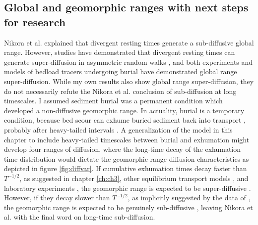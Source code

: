 \subsection{Global and geomorphic ranges with next steps for research}

Nikora et al. explained that divergent resting times generate a sub-diffusive global range.
However, studies have demonstrated that divergent resting times can generate super-diffusion in asymmetric random walks \citep{Weeks1996,Weeks1998}, and both experiments \citep{Bradley2017,Bradley2010} and models \citep{Pelosi2016,Wu2019,Wu2019a} of bedload tracers undergoing burial have demonstrated global range super-diffusion.
While my own results also show global range super-diffusion, they do not necessarily refute the Nikora et al. conclusion of sub-diffusion at long timescales.
I assumed sediment burial was a permanent condition which developed a non-diffusive geomorphic range.
In actuality, burial is a temporary condition, because bed scour can exhume buried sediment back into transport \citep{Wu2019a}, probably after heavy-tailed intervals \citep{Voepel2013,Martin2014}.
A generalization of the model in this chapter to include heavy-tailed timescales between burial and exhumation might develop four ranges of diffusion, where the long-time decay of the exhumation time distribution would dictate the geomorphic range diffusion characteristics as depicted in figure \ref{fig:diffvar}.
If cumulative exhumation times decay faster than $T^{-1/2}$, as suggested in chapter \ref{ch:ch3}, other equilibrium transport models \citep{Voepel2013, Martin2014}, and laboratory experiments \citep{Martin2014,Martin2012}, the geomorphic range is expected to be super-diffusive \citep{Weeks1998}.
However, if they decay slower than $T^{-1/2}$, as implicitly suggested by the data of \citet{Olinde2015}, the geomorphic range is expected to be genuinely sub-diffusive \citep{Weeks1998}, leaving Nikora et al. with the final word on long-time sub-diffusion.

